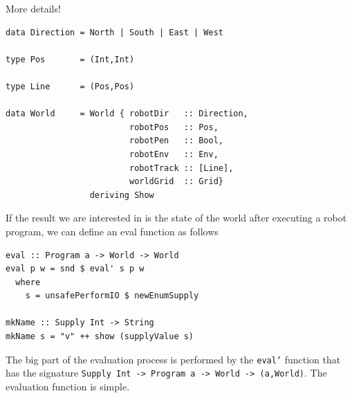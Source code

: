 More details! 

\begin{small}
\begin{verbatim} 
data Direction = North | South | East | West

type Pos       = (Int,Int)

type Line      = (Pos,Pos)  
                        
data World     = World { robotDir   :: Direction, 
                         robotPos   :: Pos,
                         robotPen   :: Bool,
                         robotEnv   :: Env,
                         robotTrack :: [Line],
                         worldGrid  :: Grid}
                 deriving Show 
\end{verbatim}
\end{small}

If the result we are interested in is the state of the world after 
executing a robot program, we can define an eval function as follows

\begin{small}
\begin{verbatim} 
eval :: Program a -> World -> World 
eval p w = snd $ eval' s p w
  where
    s = unsafePerformIO $ newEnumSupply

mkName :: Supply Int -> String
mkName s = "v" ++ show (supplyValue s)
\end{verbatim}
\end{small}

The big part of the evaluation process is performed by the {\tt eval'} function 
that has the signature \newline 
\verb!Supply Int -> Program a -> World -> (a,World)!. The evaluation function is simple.  

